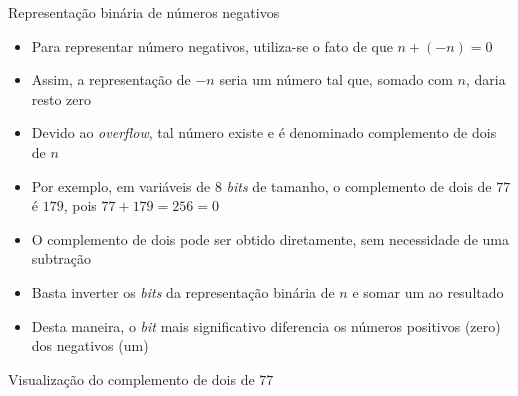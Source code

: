 \begin{frame}[fragile]{Representação binária de números negativos}

    \begin{itemize}
        \item Para representar número negativos, utiliza-se o fato de que $n + (-n) = 0$

        \item Assim, a representação de $-n$ seria um número tal que, somado com $n$, daria resto zero

        \item Devido ao \textit{overflow}, tal número existe e é denominado complemento de dois de $n$

        \item Por exemplo, em variáveis de 8 \textit{bits} de tamanho, o complemento de dois de $77$ é $179$, pois $77 + 179 = 256 = 0$

        \item O complemento de dois pode ser obtido diretamente, sem necessidade de uma subtração

        \item Basta inverter os \textit{bits} da representação binária de $n$ e somar um ao resultado

        \item Desta maneira, o \textit{bit} mais significativo diferencia os números positivos (zero) dos negativos (um)
    \end{itemize}

\end{frame}

\begin{frame}[fragile]{Visualização do complemento de dois de $77$}

    \begin{figure}
        \centering


    \end{figure}

\end{frame}
